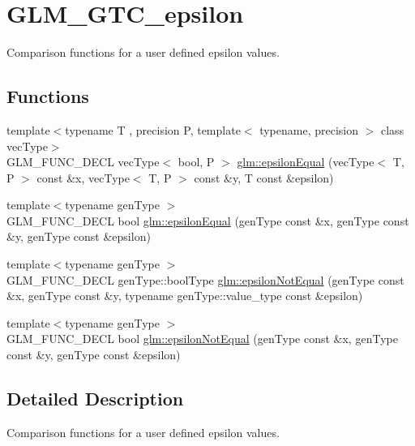 \hypertarget{group__gtc__epsilon}{}\section{G\+L\+M\+\_\+\+G\+T\+C\+\_\+epsilon}
\label{group__gtc__epsilon}


Comparison functions for a user defined epsilon values.  


\subsection*{Functions}
\begin{DoxyCompactItemize}
\item 
{\footnotesize template$<$typename T , precision P, template$<$ typename, precision $>$ class vec\+Type$>$ }\\G\+L\+M\+\_\+\+F\+U\+N\+C\+\_\+\+D\+E\+C\+L vec\+Type$<$ bool, P $>$ \hyperlink{group__gtc__epsilon_gaca9443f217dc36587624247245522331}{glm\+::epsilon\+Equal} (vec\+Type$<$ T, P $>$ const \&x, vec\+Type$<$ T, P $>$ const \&y, T const \&epsilon)
\item 
{\footnotesize template$<$typename gen\+Type $>$ }\\G\+L\+M\+\_\+\+F\+U\+N\+C\+\_\+\+D\+E\+C\+L bool \hyperlink{group__gtc__epsilon_gaa7f227999ca09e7ca994e8b35aba47bb}{glm\+::epsilon\+Equal} (gen\+Type const \&x, gen\+Type const \&y, gen\+Type const \&epsilon)
\item 
{\footnotesize template$<$typename gen\+Type $>$ }\\G\+L\+M\+\_\+\+F\+U\+N\+C\+\_\+\+D\+E\+C\+L gen\+Type\+::bool\+Type \hyperlink{group__gtc__epsilon_ga14e2888a304654ade8a3996024e2739c}{glm\+::epsilon\+Not\+Equal} (gen\+Type const \&x, gen\+Type const \&y, typename gen\+Type\+::value\+\_\+type const \&epsilon)
\item 
{\footnotesize template$<$typename gen\+Type $>$ }\\G\+L\+M\+\_\+\+F\+U\+N\+C\+\_\+\+D\+E\+C\+L bool \hyperlink{group__gtc__epsilon_ga50a92103fb0cbd796908e1bf20c79aaf}{glm\+::epsilon\+Not\+Equal} (gen\+Type const \&x, gen\+Type const \&y, gen\+Type const \&epsilon)
\end{DoxyCompactItemize}


\subsection{Detailed Description}
Comparison functions for a user defined epsilon values. 

